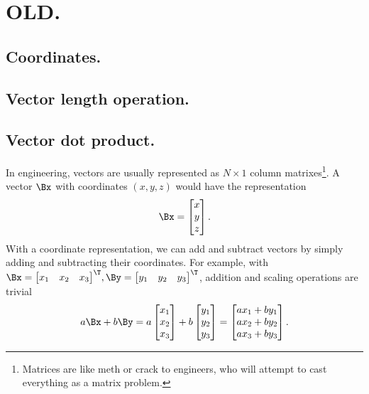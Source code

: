 
\section{OLD.}
\subsection{Coordinates.}
\subsection{Vector length operation.}
\subsection{Vector dot product.}
In engineering, vectors are usually represented as \( N \times 1 \) column matrixes\footnote{Matrices are like meth or crack to engineers, who will attempt to cast everything as a matrix problem.}.
A vector \( \Bx \) with coordinates \((x,y,z)\) would have the representation
\begin{equation}\label{eqn:multivector:60}
\Bx =
\begin{bmatrix}
x \\
y \\
z
\end{bmatrix}.
\end{equation}
With a coordinate representation, we can add and subtract vectors by simply adding and subtracting their coordinates.
For example, with
\(
\Bx =
{
\begin{bmatrix}
x_1 &
x_2 &
x_3
\end{bmatrix}
}^\T,
\By =
{\begin{bmatrix}
y_1 &
y_2 &
y_3
\end{bmatrix}}^\T \), addition and scaling operations are trivial
\begin{equation}\label{eqn:multivector:140}
a \Bx + b \By
=
a
\begin{bmatrix}
x_1 \\
x_2 \\
x_3
\end{bmatrix}
+
b
\begin{bmatrix}
y_1 \\
y_2 \\
y_3
\end{bmatrix}
=
\begin{bmatrix}
a x_1 + b y_1 \\
a x_2 + b y_2 \\
a x_3 + b y_3
\end{bmatrix}.
\end{equation}

